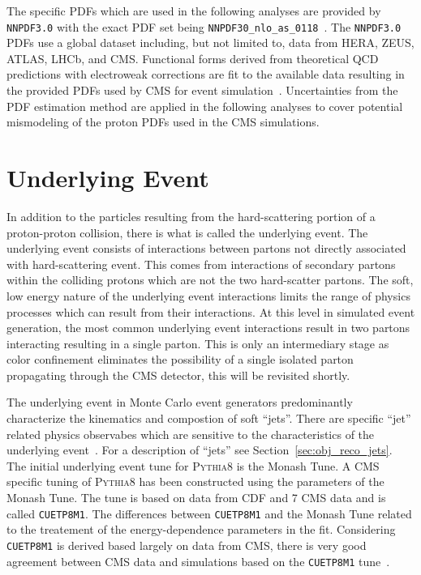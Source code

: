 The specific PDFs which are used in the
following analyses are provided by \texttt{NNPDF3.0} with the exact PDF set being 
\texttt{NNPDF30\_nlo\_as\_0118}~\cite{Ball:2014uwa, Ball:2011uy}. The \texttt{NNPDF3.0} PDFs
use a global dataset including, but not limited to, data from HERA, ZEUS, ATLAS, LHCb, and CMS.
Functional forms derived from theoretical QCD predictions with electroweak corrections are fit
to the available data resulting in the provided PDFs used by CMS for event simulation~\cite{Ball:2014uwa}.
Uncertainties from the PDF estimation method are applied in the following analyses to cover
potential mismodeling of the proton PDFs used in the CMS simulations.



\section{Underlying Event}
In addition to the particles resulting from the hard-scattering portion of a proton-proton collision,
there is what is called the underlying event. The underlying event consists of interactions between
partons not directly associated with hard-scattering event. This comes from interactions of 
secondary partons within the colliding protons which are not the two hard-scatter partons.
The soft, low energy nature of the underlying event interactions limits the range of physics
processes which can result from their interactions. At this level in simulated event generation,
the most common underlying event interactions result in two partons interacting resulting in a 
single parton. This is only an intermediary stage as color confinement eliminates the possibility
of a single isolated parton propagating through the CMS detector, this will be revisited shortly.

The underlying event in 
Monte Carlo event generators predominantly characterize the kinematics and compostion of soft ``jets''.
There are specific ``jet'' related physics observabes which are sensitive to the characteristics of the underlying
event~\cite{Khachatryan:2015pea, Field:cdf2008}. For a description of ``jets'' see Section~\ref{sec:obj_reco_jets}.
The initial underlying event tune for \textsc{Pythia8} is the Monash Tune. A CMS specific tuning of 
\textsc{Pythia8} has been constructed using the parameters of the Monash Tune. The tune is based
on data from CDF and 7 \TeV CMS data and is called \texttt{CUETP8M1}. The differences between
\texttt{CUETP8M1} and the Monash Tune related to the treatement of the energy-dependence 
parameters in the fit. Considering \texttt{CUETP8M1} is derived based largely on data from
CMS, there is very good agreement between CMS data and simulations based on the
\texttt{CUETP8M1} tune~\cite{Khachatryan:2015pea}. 



